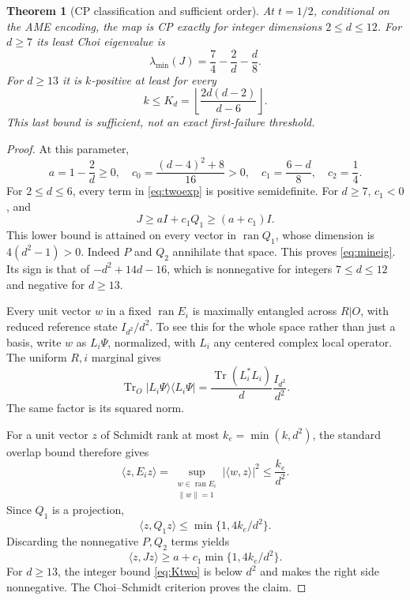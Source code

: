 \documentclass[11pt,a4paper]{article}
\newtheorem{theorem}{Theorem}
\newcommand{\Tr}{\operatorname{Tr}}
\newcommand{\ran}{\operatorname{ran}}
\begin{document}
\begin{theorem}[CP classification and sufficient order]\label{thm:two}
At \(t=1/2\), conditional on the AME encoding, the map is CP exactly for integer dimensions \(2\le d\le12\).
For \(d\ge7\) its least Choi eigenvalue is
\begin{equation}\label{eq:mineig}
 \lambda_{\min}(J)=\frac74-\frac2d-\frac d8.
\end{equation}
For \(d\ge13\) it is \(k\)-positive at least for every
\begin{equation}\label{eq:Ktwo}
 k\le K_d=\left\lfloor\frac{2d(d-2)}{d-6}\right\rfloor.
\end{equation}
This last bound is sufficient, not an exact first-failure threshold.
\end{theorem}
\begin{proof}
At this parameter,
\[
 a=1-\frac2d\ge0,\quad
 c_0=\frac{(d-4)^2+8}{16}>0,\quad
 c_1=\frac{6-d}{8},\quad c_2=\frac14.
\]
For \(2\le d\le6\), every term in \eqref{eq:twoexp} is positive semidefinite.
For \(d\ge7\), \(c_1<0\), and
\[
 J\ge aI+c_1Q_1\ge(a+c_1)I.
\]
This lower bound is attained on every vector in \(\ran Q_1\), whose dimension is \(4(d^2-1)>0\). Indeed \(P\) and \(Q_2\) annihilate that space. This proves \eqref{eq:mineig}. Its sign is that of \(-d^2+14d-16\), which is nonnegative for integers \(7\le d\le12\) and negative for \(d\ge13\).

Every unit vector \(w\) in a fixed \(\ran E_i\) is maximally entangled across \(R|O\), with reduced reference state \(I_{d^2}/d^2\). To see this for the whole space rather than just a basis, write \(w\) as \(L_i\Psi\), normalized, with \(L_i\) any centered complex local operator. The uniform \(R,i\) marginal gives
\[
 \Tr_O|L_i\Psi\rangle\langle L_i\Psi|
   =\frac{\Tr(L_i^*L_i)}{d}\frac{I_{d^2}}{d^2}.
\]
The same factor is its squared norm.

For a unit vector \(z\) of Schmidt rank at most \(k_e=\min(k,d^2)\), the standard overlap bound therefore gives
\[
 \langle z,E_i z\rangle
 =\sup_{\substack{w\in\ran E_i\\\|w\|=1}}|\langle w,z\rangle|^2
 \le\frac{k_e}{d^2}.
\]
Since \(Q_1\) is a projection,
\[
 \langle z,Q_1z\rangle\le\min\{1,4k_e/d^2\}.
\]
Discarding the nonnegative \(P,Q_2\) terms yields
\begin{equation}\label{eq:rankboundtwo}
 \langle z,Jz\rangle\ge a+c_1\min\{1,4k_e/d^2\}.
\end{equation}
For \(d\ge13\), the integer bound \eqref{eq:Ktwo} is below \(d^2\) and makes the right side nonnegative. The Choi--Schmidt criterion proves the claim.
\end{proof}
\end{document}
